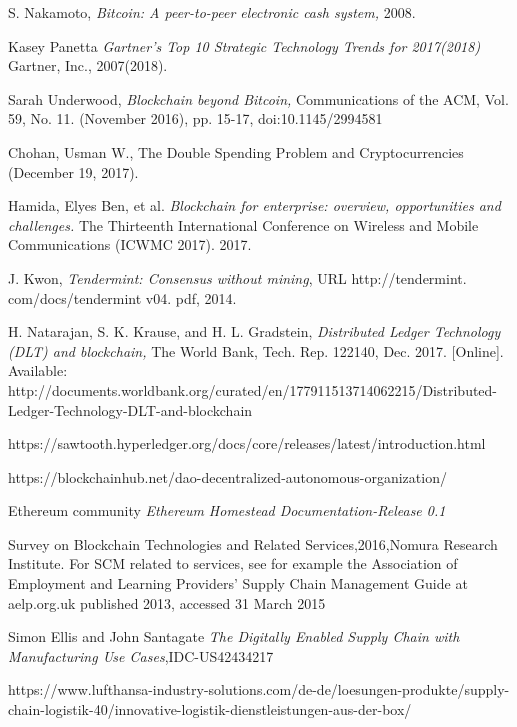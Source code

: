 \begin{thebibliography}{99}
 S. Nakamoto, \textit{Bitcoin: A peer-to-peer electronic cash system,} 2008.

 Kasey Panetta \textit{Gartner’s Top 10 Strategic Technology Trends for 2017(2018)} Gartner, Inc., 2007(2018).   

 Sarah Underwood, \textit{Blockchain beyond Bitcoin,} Communications of the ACM, Vol. 59, No. 11. (November 2016), pp. 15-17, doi:10.1145/2994581

 Chohan, Usman W., The Double Spending Problem and Cryptocurrencies (December 19, 2017).

 Hamida, Elyes Ben, et al. \textit{Blockchain for enterprise: overview, opportunities and challenges.} The Thirteenth International Conference on Wireless and Mobile Communications (ICWMC 2017). 2017.

 J. Kwon, \textit{Tendermint: Consensus without mining}, URL http://tendermint. com/docs/tendermint { } v04. pdf, 2014.
 
 H. Natarajan, S. K. Krause, and H. L. Gradstein, \textit{Distributed Ledger Technology (DLT) and blockchain,} The World Bank, Tech. Rep. 122140, Dec. 2017. [Online].
Available: http://documents.worldbank.org/curated/en/177911513714062215/Distributed-
Ledger-Technology-DLT-and-blockchain

 https://sawtooth.hyperledger.org/docs/core/releases/latest/introduction.html

 https://blockchainhub.net/dao-decentralized-autonomous-organization/

 Ethereum community \textit{Ethereum Homestead Documentation-Release 0.1}

Survey on Blockchain Technologies and Related Services,2016,Nomura Research Institute.
 For SCM related to services, see for example the Association of Employment and Learning Providers' Supply Chain Management Guide at aelp.org.uk published 2013, accessed 31 March 2015

 Simon Ellis and John Santagate \textit{The Digitally Enabled Supply Chain with Manufacturing Use Cases},IDC-US42434217

 https://www.lufthansa-industry-solutions.com/de-de/loesungen-produkte/supply-chain-logistik-40/innovative-logistik-dienstleistungen-aus-der-box/


\end{thebibliography}
